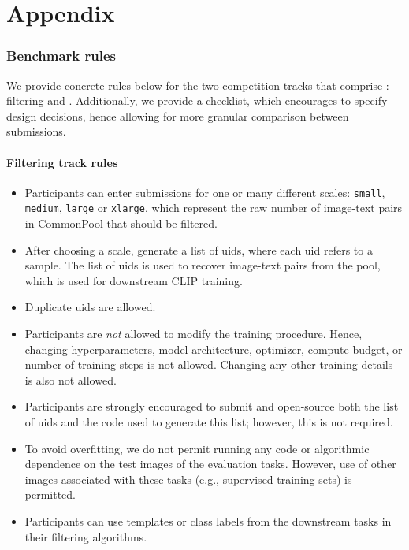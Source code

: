 \part*{Appendix}
\tableofcontents

\section{Benchmark rules}
\label{sec:full-competition-rules}

We provide concrete rules below for the two competition tracks that comprise \datanet: filtering and \byod.
Additionally, we provide a checklist, which encourages \users to specify design decisions, hence allowing for more granular comparison between submissions.

\subsection{Filtering track rules}

\begin{itemize}
    \itemsep0em 
    \item Participants can enter submissions for one or many different scales: \texttt{small}, \texttt{medium}, \texttt{large} or \texttt{xlarge}, which represent the raw number of image-text pairs in CommonPool that should be filtered.
    \item After choosing a scale, \users generate a list of uids, where each uid refers to a \pool sample. The list of uids is used to recover image-text pairs from the pool, which is used for downstream CLIP training.
    \item Duplicate uids are allowed.
    \item Participants are \emph{not} allowed to modify the training procedure. Hence, changing hyperparameters, model architecture, optimizer, compute budget, or number of training steps is not allowed. Changing any other training details is also not allowed.
    \item Participants are strongly encouraged to submit and open-source both the list of uids and the code used to generate this list; however, this is not required.
    \item To avoid overfitting, we do not permit running any code or algorithmic dependence on the test images of the evaluation tasks. However, use of other images associated with these tasks (e.g., supervised training sets) is permitted.
    \item Participants can use templates or class labels from the downstream tasks in their filtering algorithms.
\end{itemize}

